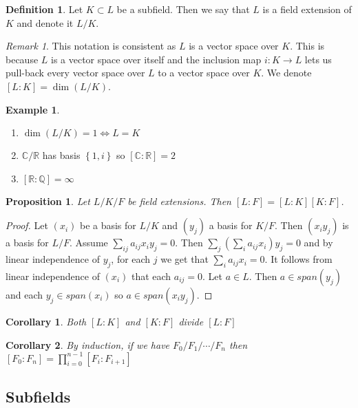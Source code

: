 \documentclass{article}
\newcommand\R{\ensuremath{\mathbb{R}}}
\newcommand\Q{\ensuremath{\mathbb{Q}}}
\newcommand\C{\ensuremath{\mathbb{C}}}
\newtheorem{corollary}{Corollary}[theorem]
\theoremstyle{definition}
\newtheorem{definition}{Definition}[subsection]
\newtheorem{eg}{Example}[subsection]
\theoremstyle{remark}
\newtheorem*{remark}{Remark}
\theoremstyle{plain}
\newtheorem{prop}{Proposition}[subsection]
\begin{document}
\begin{definition}
    Let \(K \subset L\) be a subfield. Then we say that \(L\) is a field extension of \(K\) and denote it \(L/K\).
\end{definition}

\begin{remark}
    This notation is consistent as \(L\) is a vector space over \(K\). This is because \(L\) is a vector space over itself and the inclusion map \(i: K \to L\) lets us pull-back 
    every vector space over \(L\) to a vector space over \(K\). We denote \([L:K] = \dim (L/K)\).
\end{remark}

\begin{eg}
    \begin{enumerate}
        \item \(\dim (L/K) = 1 \iff L = K\)
        \item \(\C/\R\) has basis \(\left\{ 1,i \right\}\) so \([\C: \R] = 2\)
        \item \([\R: \Q] = \infty\)
    \end{enumerate}
\end{eg}

\begin{prop}
    Let \(L/K/F\) be field extensions. Then \([L:F] = [L:K][K:F]\).
\end{prop}
\begin{proof}
    Let \((x_i)\) be a basis for \(L/K\) and \((y_j)\) a basis for \(K/F\).
    Then \((x_iy_j)\) is a basis for \(L/F\). Assume \(\sum_{ij} a_{ij}x_iy_j = 0\). Then
    \(\sum_j (\sum_i a_{ij}x_i)y_j = 0 \) and by linear independence of \(y_j\), for each \(j\) we get that  \(\sum_i a_{ij}x_i = 0\).
    It follows from linear independence of \((x_i)\) that each \(a_{ij} = 0\). Let \(a \in L\). Then \(a \in span (y_j)\) and each \(y_j \in span (x_i)\) so \(a \in span(x_iy_j)\).
\end{proof}

\begin{corollary}
    Both \([L:K]\) and \([K:F]\) divide \([L:F]\)
\end{corollary}
\begin{corollary}
    By induction, if we have \(F_0/F_1/\cdots/F_n\) then \([F_0: F_n] = \prod\limits_{i=0}^{n-1}[F_i: F_{i+1}]\)
\end{corollary}

\subsection{Subfields}
\end{document}

